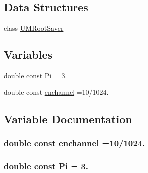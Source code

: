\subsection*{Data Structures}
\begin{DoxyCompactItemize}
\item 
class \hyperlink{classUMRootSaver}{U\+M\+Root\+Saver}
\end{DoxyCompactItemize}
\subsection*{Variables}
\begin{DoxyCompactItemize}
\item 
double const \hyperlink{UMRootSaver_8hh_af34a60530f8569053554dd583a3a5d94}{Pi} = 3.
\item 
double const \hyperlink{UMRootSaver_8hh_aca7bc9761c8c10a46efda2d551b32825}{enchannel} =10/1024.
\end{DoxyCompactItemize}


\subsection{Variable Documentation}
\hypertarget{UMRootSaver_8hh_aca7bc9761c8c10a46efda2d551b32825}{}
\subsubsection[{enchannel}]{\setlength{\rightskip}{0pt plus 5cm}double const enchannel =10/1024.}\label{UMRootSaver_8hh_aca7bc9761c8c10a46efda2d551b32825}
\hypertarget{UMRootSaver_8hh_af34a60530f8569053554dd583a3a5d94}{}
\subsubsection[{Pi}]{\setlength{\rightskip}{0pt plus 5cm}double const Pi = 3.}\label{UMRootSaver_8hh_af34a60530f8569053554dd583a3a5d94}
